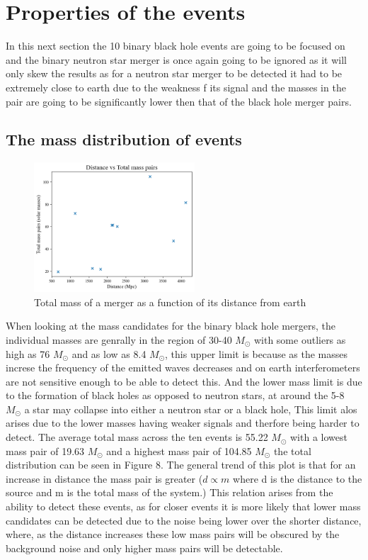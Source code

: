 \documentclass{article}
\begin{document}
\section*{Properties of the events}
In this next section the 10 binary black hole events are going to be focused on and the binary
neutron star merger is once again going to be ignored as
it will only skew the results as for a neutron star merger to be detected it had to be extremely
close to earth due to the weakness f its signal and the masses in the pair are going to be
significantly lower then that of the black hole merger pairs.
\subsection*{The mass distribution of events}
\begin{figure}
    \includegraphics[width=6cm]{images/mass_pairs.png}
    \caption{Total mass of a merger as a function of its distance from earth}
    \label{fig:mass_pairs}
\end{figure}

When looking at the mass candidates for the binary black hole mergers, the individual masses are genrally in the region of
30-40 $M_{\odot}$ with some outliers as high as 76 $M_{\odot}$ and as low as 8.4 $M_{\odot}$, this upper limit is because as the masses increse the frequency of the emitted waves
decreases and on earth interferometers are not sensitive enough to be able to detect this. And the lower mass limit is due to the
formation of black holes as opposed to neutron stars, at around the 5-8 $M_{\odot}$ a star may collapse into either a neutron star or a black hole,
This limit alos arises due to the lower masses having weaker signals and therfore being harder to detect. The average total mass across
the ten events is 55.22 $M_{\odot}$ with a lowest mass pair of 19.63 $M_{\odot}$ and a highest
mass pair of 104.85 $M_{\odot} $ the total distribution can be seen in Figure 8.
The general trend of this plot is that for an increase in distance the mass pair is greater ($d \propto m $ where d is the distance to the source and m is the total mass of the system.)
This relation arises from the ability to detect these events, as for closer events it is more likely that lower mass candidates can be
detected due to the noise being lower over the shorter distance, where, as the distance increases these low mass pairs will be obscured by the background noise and only higher
mass pairs will be detectable.
\end{document}

